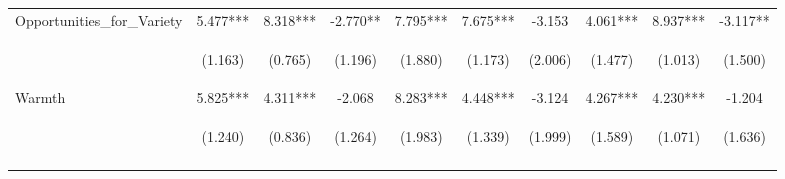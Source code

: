 \begin{tabular}{lccccccccc}
\noalign{\smallskip}Opportunities_for_Variety & 5.477*** & 8.318*** & -2.770** & 7.795*** & 7.675*** & -3.153 & 4.061*** & 8.937*** & -3.117**\\
 & \begin{footnotesize}(1.163)\end{footnotesize} & \begin{footnotesize}(0.765)\end{footnotesize} & \begin{footnotesize}(1.196)\end{footnotesize} & \begin{footnotesize}(1.880)\end{footnotesize} & \begin{footnotesize}(1.173)\end{footnotesize} & \begin{footnotesize}(2.006)\end{footnotesize} & \begin{footnotesize}(1.477)\end{footnotesize} & \begin{footnotesize}(1.013)\end{footnotesize} & \begin{footnotesize}(1.500)\end{footnotesize}\\
\noalign{\smallskip}Warmth & 5.825*** & 4.311*** & -2.068 & 8.283*** & 4.448*** & -3.124 & 4.267*** & 4.230*** & -1.204\\
 & \begin{footnotesize}(1.240)\end{footnotesize} & \begin{footnotesize}(0.836)\end{footnotesize} & \begin{footnotesize}(1.264)\end{footnotesize} & \begin{footnotesize}(1.983)\end{footnotesize} & \begin{footnotesize}(1.339)\end{footnotesize} & \begin{footnotesize}(1.999)\end{footnotesize} & \begin{footnotesize}(1.589)\end{footnotesize} & \begin{footnotesize}(1.071)\end{footnotesize} & \begin{footnotesize}(1.636)\end{footnotesize}\\
\noalign{\smallskip}\hline\end{tabular}\\
